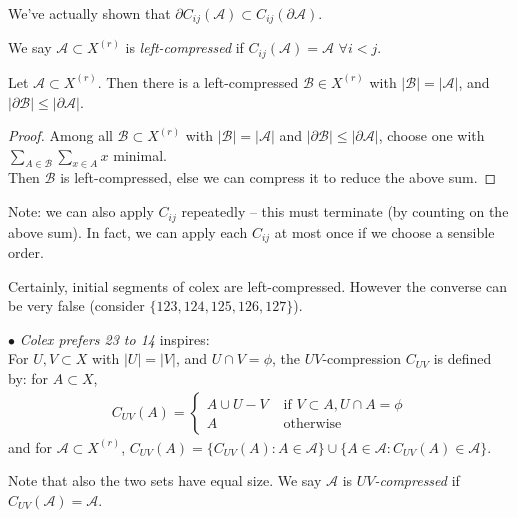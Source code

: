 \documentclass[a4paper]{article}
\begin{document}
\begin{rem}
    We've actually shown that $\partial C_{ij}(\mathcal{A}) \subset C_{ij}(\partial \mathcal{A})$.
\end{rem}

We say $\mathcal{A} \subset X^{(r)}$ is \emph{left-compressed} if $C_{ij}(\mathcal{A}) = \mathcal{A}$ $\forall i < j$.

\begin{prop}
    Let $\mathcal{A} \subset X^{(r)}$. Then there is a left-compressed $\mathcal{B} \in X^{(r)}$ with $|\mathcal{B}| = |\mathcal{A}|$, and $|\partial \mathcal{B}| \leq |\partial \mathcal{A}|$.
    \begin{proof}
        Among all $\mathcal{B} \subset X^{(r)}$ with $|\mathcal{B}| = |\mathcal{A}|$ and $|\partial \mathcal{B}| \leq |\partial \mathcal{A}|$, choose one with $\sum_{A \in \mathcal{B}} \sum_{x \in A} x$ minimal.\\
        Then $\mathcal{B}$ is left-compressed, else we can compress it to reduce the above sum.
    \end{proof}
\end{prop}

Note: we can also apply $C_{ij}$ repeatedly -- this must terminate (by counting on the above sum). In fact, we can apply each $C_{ij}$ at most once if we choose a sensible order.

Certainly, initial segments of colex are left-compressed. However the converse can be very false (consider $\{123,124,125,126,127\}$).

$\bullet$ \emph{Colex prefers 23 to 14} inspires:\\
For $U,V \subset X$ with $|U| = |V|$, and $U \cap V = \phi$, the $UV$-compression $C_{UV}$ is defined by: for $A \subset X$,
\begin{equation*}
    \begin{aligned}
        C_{UV}(A) = \left\{
            \begin{array}{ll}
                A\cup U - V & \text{ if } V \subset A, U \cap A = \phi\\
                A & \text{ otherwise}
            \end{array}
        \right.
    \end{aligned}
\end{equation*}
and for $\mathcal{A} \subset X^{(r)}$, $C_{UV}(A) = \{C_{UV}(A):A \in \mathcal{A}\} \cup \{A \in \mathcal{A}: C_{UV}(A)\in \mathcal{A}\}$.

Note that also the two sets have equal size. We say $\mathcal{A}$ is \emph{$UV$-compressed} if $C_{UV}(\mathcal{A}) = \mathcal{A}$.
\end{document}
